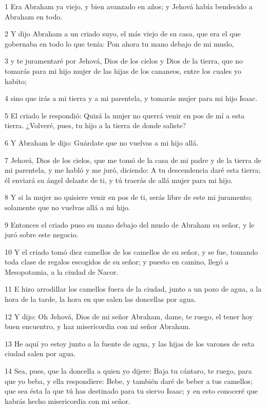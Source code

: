 \par 1 Era Abraham ya viejo, y bien avanzado en años; y Jehová había bendecido a Abraham en todo.
\par 2 Y dijo Abraham a un criado suyo, el más viejo de su casa, que era el que gobernaba en todo lo que tenía: Pon ahora tu mano debajo de mi muslo,
\par 3 y te juramentaré por Jehová, Dios de los cielos y Dios de la tierra, que no tomarás para mi hijo mujer de las hijas de los cananeos, entre los cuales yo habito;
\par 4 sino que irás a mi tierra y a mi parentela, y tomarás mujer para mi hijo Isaac.
\par 5 El criado le respondió: Quizá la mujer no querrá venir en pos de mí a esta tierra. ¿Volveré, pues, tu hijo a la tierra de donde saliste?
\par 6 Y Abraham le dijo: Guárdate que no vuelvas a mi hijo allá.
\par 7 Jehová, Dios de los cielos, que me tomó de la casa de mi padre y de la tierra de mi parentela, y me habló y me juró, diciendo: A tu descendencia daré esta tierra; él enviará su ángel delante de ti, y tú traerás de allá mujer para mi hijo.
\par 8 Y si la mujer no quisiere venir en pos de ti, serás libre de este mi juramento; solamente que no vuelvas allá a mi hijo.
\par 9 Entonces el criado puso su mano debajo del muslo de Abraham su señor, y le juró sobre este negocio.
\par 10 Y el criado tomó diez camellos de los camellos de su señor, y se fue, tomando toda clase de regalos escogidos de su señor; y puesto en camino, llegó a Mesopotamia, a la ciudad de Nacor.
\par 11 E hizo arrodillar los camellos fuera de la ciudad, junto a un pozo de agua, a la hora de la tarde, la hora en que salen las doncellas por agua.
\par 12 Y dijo: Oh Jehová, Dios de mi señor Abraham, dame, te ruego, el tener hoy buen encuentro, y haz misericordia con mi señor Abraham.
\par 13 He aquí yo estoy junto a la fuente de agua, y las hijas de los varones de esta ciudad salen por agua.
\par 14 Sea, pues, que la doncella a quien yo dijere: Baja tu cántaro, te ruego, para que yo beba, y ella respondiere: Bebe, y también daré de beber a tus camellos; que sea ésta la que tú has destinado para tu siervo Isaac; y en esto conoceré que habrás hecho misericordia con mi señor.
